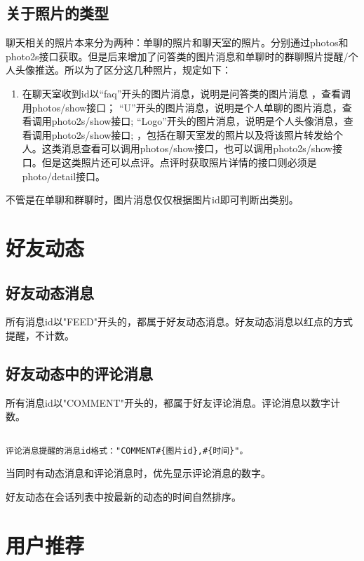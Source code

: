 \subsection{关于照片的类型}
聊天相关的照片本来分为两种：单聊的照片和聊天室的照片。分别通过photos和photo2s接口获取。但是后来增加了问答类的图片消息和单聊时的群聊照片提醒/个人头像推送。所以为了区分这几种照片，规定如下：
\begin{enumerate}
\item 在聊天室收到id以“faq”开头的图片消息，说明是问答类的图片消息 ，查看调用photos/show接口；
“U”开头的图片消息，说明是个人单聊的图片消息，查看调用photo2s/show接口;
“Logo”开头的图片消息，说明是个人头像消息，查看调用photo2s/show接口;
，包括在聊天室发的照片以及将该照片转发给个人。这类消息查看可以调用photos/show接口，也可以调用photo2s/show接口。但是这类照片还可以点评。点评时获取照片详情的接口则必须是photo/detail接口。
\end{enumerate}

不管是在单聊和群聊时，图片消息仅仅根据图片id即可判断出类别。

\section{好友动态}
\subsection{好友动态消息}
所有消息id以"FEED"开头的，都属于好友动态消息。好友动态消息以红点的方式提醒，不计数。
\subsection{好友动态中的评论消息}
所有消息id以"COMMENT"开头的，都属于好友评论消息。评论消息以数字计数。
\begin{verbatim}

评论消息提醒的消息id格式："COMMENT#{图片id},#{时间}"。
\end{verbatim}

当同时有动态消息和评论消息时，优先显示评论消息的数字。

好友动态在会话列表中按最新的动态的时间自然排序。






\section{用户推荐}

